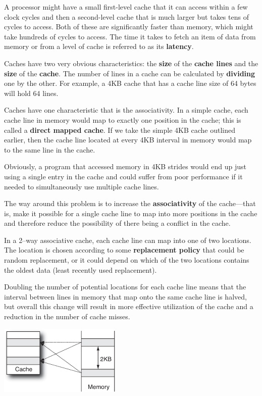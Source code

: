 \documentclass[12pt,a4paper]{report}
\begin{document}
 \par
 A processor might have a small first-level cache that it can access within a few clock cycles and then a second-level cache that is much larger but takes tens of cycles to access. Both of these are significantly faster than memory, which might take hundreds of cycles to access. The time it takes to fetch an item of data from memory or from a level of cache is referred to as its \textbf{latency}.
 \par
 Caches have two very obvious characteristics: the \textbf{size} of the \textbf{cache lines} and the \textbf{size} of the \textbf{cache}. The number of lines in a cache can be calculated by \textbf{dividing} one by the other. For example, a 4KB cache that has a cache line size of 64 bytes will hold 64 lines.
 \par
 Caches have one characteristic that is the associativity. In a simple cache, each cache line in memory would map to exactly one position in the cache; this is called a \textbf{direct mapped cache}. If we take the simple 4KB cache outlined earlier, then the cache line located at every 4KB interval in memory would map to the same line in the cache.
\par
Obviously, a program that accessed memory in 4KB strides would end up just using a single entry in the cache and could suffer from poor performance if it needed to simultaneously use multiple cache lines.
\par
The way around this problem is to increase the \textbf{associativity} of the cache---that is, make it possible for a single cache line to map into more positions in the cache and therefore reduce the possibility of there being a conflict in the cache.
\par
In a 2--way associative cache, each cache line can map into one of two locations. The location is chosen according to some \textbf{replacement policy} that could be random replacement, or it could depend on which of the two locations contains the oldest data (least recently used replacement).
\par
Doubling the number of potential locations for each cache line means that the interval between lines in memory that map onto the same cache line is halved, but overall this change will result in more effective utilization of the cache and a reduction in the number of cache misses.
\begin{center}
	\includegraphics{multicore_2_way_cache_line.jpg}
\end{center}
\end{document}
